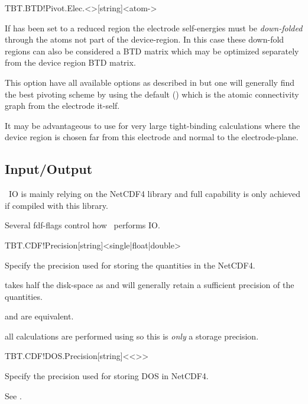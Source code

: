 \begin{fdfentry}{TBT.BTD!Pivot.Elec.<>}[string]<atom-\nonvalue{<>}>

  If  has been set to a reduced region the
  electrode self-energies must be \emph{down-folded} through the atoms
  not part of the device-region. In this case these down-fold regions
  can also be considered a BTD matrix which may be optimized
  separately from the device region BTD matrix.

  This option have all available options as described in
   but one will generally find the best
  pivoting scheme by using the default () which is the
  atomic connectivity graph from the electrode it-self.

  It may be advantageous to use  for very large
  tight-binding calculations where the device region is chosen far
  from this electrode and normal to the electrode-plane. 

\end{fdfentry}


\subsection{Input/Output}

\tbtrans\ IO is mainly relying on the NetCDF4 library and full
capability is only achieved if compiled with this library.

Several fdf-flags control how \tbtrans\ performs IO.


\begin{fdfentry}{TBT.CDF!Precision}[string]<single|float|double>

  Specify the precision used for storing the quantities in the
  NetCDF4.

   takes half the disk-space as  and will
  generally retain a sufficient precision of the quantities. 

   and  are equivalent.

  \note all calculations are performed using  so this is
  \emph{only} a storage precision.
  
\end{fdfentry}

\begin{fdfentry}{TBT.CDF!DOS.Precision}[string]<{<>}>

  Specify the precision used for storing DOS in NetCDF4.

  See .
  
\end{fdfentry}

